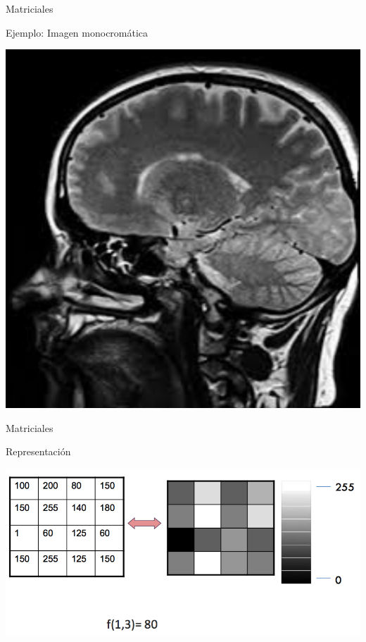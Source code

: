 \documentclass{bredelebeamer}
\begin{document}
\begin{frame}{Matriciales}
\begin{center}
Ejemplo: Imagen monocromática
\end{center}
\begin{center}
\includegraphics[scale=0.3]{images/img42.png}
\end{center}
\end{frame}

\begin{frame}{Matriciales}
\begin{center}
Representación
\end{center}
\begin{center}
\includegraphics[scale=0.3]{images/img43.png}
\end{center}
\end{frame}
\end{document}
